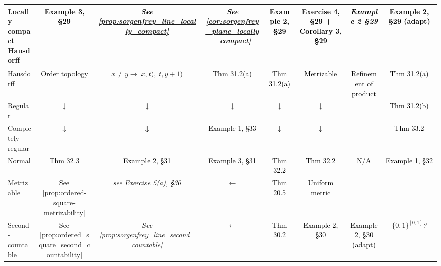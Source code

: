 \documentclass[11pt]{article}
\providecommand{\GridYes}[1]{\cellcolor{green!30}\textcolor{black}{#1}}
\providecommand{\GridNo}[1]{\cellcolor{red!27}\textcolor{black}{#1}}
\providecommand{\GridWork}[1]{\cellcolor{yellow!25}\textcolor{black}{#1}}
\providecommand{\GridNA}{\cellcolor{black!22}\textcolor{black}{\textsf{N/A}}}
\providecommand{\GridHint}[1]{\textit{#1}}
\begin{document}
\begin{center}
{\begin{tabular}{|l|*{7}{c|}}
\hline
\shortstack[l]{Locally compact\\Hausdorff}
 & \GridYes{Example 3, \S29} & \GridNo{\GridHint{See \cref{prop:sorgenfrey_line_locally_compact}}}
 & \GridNo{\GridHint{See \cref{cor:sorgenfrey_plane_locally_compact}}} & \GridNo{Example 2, \S29}
 & \GridNo{Exercise 4, \S29 + Corollary 3, \S29} & \GridNo{\GridHint{Example 2 \S29}}
 & \GridNo{Example 2, \S29 (adapt)} \\
\hline
Hausdorff
 & \GridYes{Order topology} & \GridYes{\GridHint{$x\neq y \to 
 [x,t), [t, y+1)$}}
 & \GridYes{Thm 31.2(a)} & \GridYes{Thm 31.2(a)}
 & \GridYes{Metrizable} & \GridYes{Refinement of product}
 & \GridYes{Thm 31.2(a)} \\
\hline
Regular
 & \GridYes{$\downarrow$} & \GridYes{$\downarrow$}
 & \GridYes{$\downarrow$} & \GridYes{$\downarrow$}
 & \GridYes{$\downarrow$} & & \GridYes{Thm 31.2(b)} \\
\hline
Completely regular
 & \GridYes{$\downarrow$} & \GridYes{$\downarrow$}
 & \GridYes{Example 1, \S33} & \GridYes{$\downarrow$}
 & \GridYes{$\downarrow$} & & \GridYes{Thm 33.2} \\
\hline
Normal
 & \GridYes{Thm 32.3} & \GridYes{Example 2, \S31}
 & \GridNo{Example 3, \S31} & \GridYes{Thm 32.2}
 & \GridYes{Thm 32.2} & \GridNA
 & \GridNo{Example 1, \S32} \\
\hline
Metrizable
 & \GridWork{\GridNo{See \cref{prop:ordered-square-metrizability}}} & \GridNo{\GridHint{see Exercise 5(a), \S30}}
 & \GridNo{$\leftarrow$} & \GridYes{Thm 20.5}
 & \GridYes{Uniform metric} & \GridNo{\GridHint{}}
 & \GridWork{\GridHint{}} \\
\hline
Second-countable
 & \GridNo{See \cref{prop:ordered_square_second_countability}} & \GridNo{\GridHint{See \cref{prop:sorgenfrey_line_second_countable}}}
 & \GridNo{$\leftarrow$} & \GridYes{Thm 30.2}
 & \GridNo{Example 2, \S30} & \GridNo{Example 2, \S30 (adapt)}
 & \GridWork{\GridHint{$\{0,1\}^{[0,1]}$?}} \\
\hline
\end{tabular}%
}
\end{center}
\endgroup

\bigskip
\end{document}

